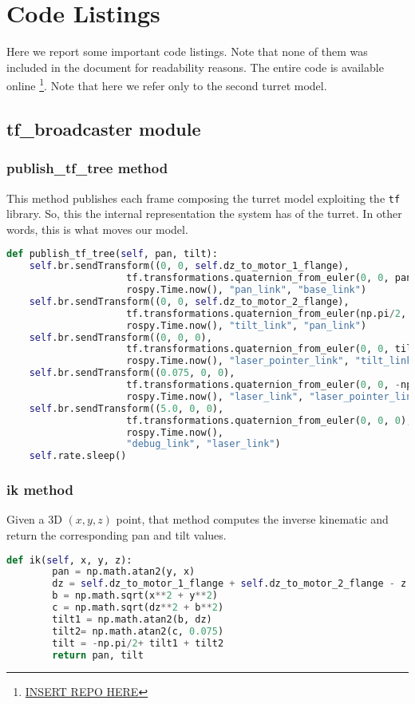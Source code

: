 \chapter{Code Listings}
\label{Appen:B}
Here we report some important code listings. Note that none of them was included in the document for readability reasons. The entire code is available online \footnote{\url{INSERT REPO HERE}}. Note that here we refer only to the second turret model.
\section*{tf\_broadcaster module}\label{sec:tfbroadcaster}
\subsection*{publish\_tf\_tree method}
This method publishes each frame composing the turret model exploiting the \texttt{tf} library. So, this the internal representation the system has of the turret. In other words, this is what moves our  model.
\begin{lstlisting}[caption={Publish Turret tf Tree},label={lst:tftree},language=Python]
def publish_tf_tree(self, pan, tilt):
    self.br.sendTransform((0, 0, self.dz_to_motor_1_flange),
                     tf.transformations.quaternion_from_euler(0, 0, pan),
                     rospy.Time.now(), "pan_link", "base_link")
    self.br.sendTransform((0, 0, self.dz_to_motor_2_flange),
                     tf.transformations.quaternion_from_euler(np.pi/2, -np.pi/2, 0),
                     rospy.Time.now(), "tilt_link", "pan_link")
    self.br.sendTransform((0, 0, 0),
                     tf.transformations.quaternion_from_euler(0, 0, tilt - np.pi/2),
                     rospy.Time.now(), "laser_pointer_link", "tilt_link")
    self.br.sendTransform((0.075, 0, 0),
                     tf.transformations.quaternion_from_euler(0, 0, -np.pi/2),
                     rospy.Time.now(), "laser_link", "laser_pointer_link")
    self.br.sendTransform((5.0, 0, 0),
                     tf.transformations.quaternion_from_euler(0, 0, 0),
                     rospy.Time.now(),
                     "debug_link", "laser_link")
    self.rate.sleep()
\end{lstlisting}
\subsection*{ik method}
Given a 3D $(x, y, z)$ point, that method computes the inverse kinematic and return the corresponding pan and tilt values.
\begin{lstlisting}[caption={Inverse Kinematic},label={lst:ik},language=Python]
def ik(self, x, y, z):
        pan = np.math.atan2(y, x)
        dz = self.dz_to_motor_1_flange + self.dz_to_motor_2_flange - z
        b = np.math.sqrt(x**2 + y**2)
        c = np.math.sqrt(dz**2 + b**2)
        tilt1 = np.math.atan2(b, dz)
        tilt2= np.math.atan2(c, 0.075)
        tilt = -np.pi/2+ tilt1 + tilt2
        return pan, tilt
\end{lstlisting}
